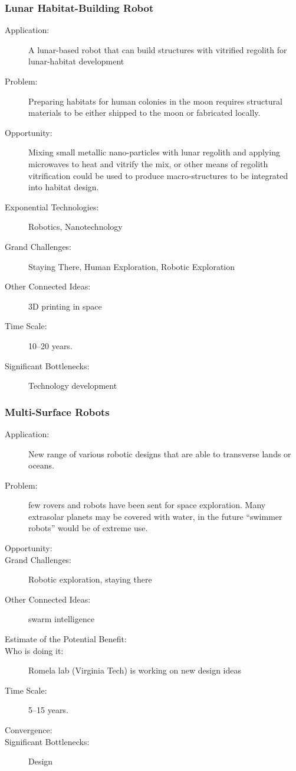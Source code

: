     \subsubsection{Lunar Habitat-Building Robot}
 \begin{description}  \item[Application:] A lunar-based robot that can build structures with
vitrified regolith for  lunar-habitat development
 
  \item[Problem:] Preparing  habitats for human colonies in the moon requires
structural materials to be either  shipped to the moon or fabricated
locally.
 
  \item[Opportunity:] Mixing small  metallic nano-particles with lunar
regolith  and applying microwaves to heat and vitrify the mix, or other
means of regolith vitrification  could be used to produce
macro-structures  to be integrated into habitat design.
 
  \item[Exponential Technologies:]  Robotics, Nanotechnology
 
  \item[Grand Challenges:] Staying  There, Human Exploration, Robotic Exploration
 
  \item[Other Connected Ideas:] 3D printing in space
 
 
  \item[Time Scale:] 10--20 years.
 
  \item[Significant Bottlenecks:] Technology development
   \end{description}
  
\subsubsection{Multi-Surface Robots}
\begin{description}  \item[Application:] New range of various robotic designs that are able  to transverse lands or oceans.
\item[Problem:]  few rovers and robots have been sent for space exploration. Many  extrasolar planets may be covered with water, in the future ``swimmer  robots'' would be of extreme use.
\item[Opportunity:] 
\item[Grand Challenges:] Robotic  exploration, staying there
\item[Other Connected Ideas:] swarm intelligence
\item[Estimate of the Potential  Benefit:] 
\item[Who is doing it:] Romela lab (Virginia Tech) is  working on new design ideas \cite{AUV2010}
\item[Time Scale:] 5--15 years.
\item[Convergence:] 
\item[Significant Bottlenecks:]  Design 
\end{description}
 
